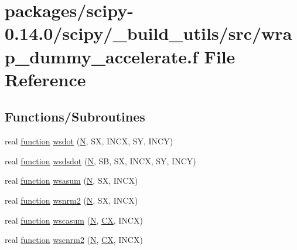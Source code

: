 \hypertarget{wrap__dummy__accelerate_8f}{}\section{packages/scipy-\/0.14.0/scipy/\+\_\+build\+\_\+utils/src/wrap\+\_\+dummy\+\_\+accelerate.f File Reference}
\label{wrap__dummy__accelerate_8f}
\subsection*{Functions/\+Subroutines}
\begin{DoxyCompactItemize}
\item 
real \hyperlink{afunc_8m_a7b5e596df91eadea6c537c0825e894a7}{function} \hyperlink{wrap__dummy__accelerate_8f_a1b9bea8bb64ba3df6b68f5a3bd335dd3}{wsdot} (\hyperlink{polmisc_8c_a0240ac851181b84ac374872dc5434ee4}{N}, S\+X, I\+N\+C\+X, S\+Y, I\+N\+C\+Y)
\item 
real \hyperlink{afunc_8m_a7b5e596df91eadea6c537c0825e894a7}{function} \hyperlink{wrap__dummy__accelerate_8f_aff7be3c1ed0bc89dd78a56568ad1c358}{wsdsdot} (\hyperlink{polmisc_8c_a0240ac851181b84ac374872dc5434ee4}{N}, S\+B, S\+X, I\+N\+C\+X, S\+Y, I\+N\+C\+Y)
\item 
real \hyperlink{afunc_8m_a7b5e596df91eadea6c537c0825e894a7}{function} \hyperlink{wrap__dummy__accelerate_8f_abc60eaafcfdb27c2f5ef726d8a9180e9}{wsasum} (\hyperlink{polmisc_8c_a0240ac851181b84ac374872dc5434ee4}{N}, S\+X, I\+N\+C\+X)
\item 
real \hyperlink{afunc_8m_a7b5e596df91eadea6c537c0825e894a7}{function} \hyperlink{wrap__dummy__accelerate_8f_a9dece8eb6e8208e78b365d485db1b2ef}{wsnrm2} (\hyperlink{polmisc_8c_a0240ac851181b84ac374872dc5434ee4}{N}, S\+X, I\+N\+C\+X)
\item 
real \hyperlink{afunc_8m_a7b5e596df91eadea6c537c0825e894a7}{function} \hyperlink{wrap__dummy__accelerate_8f_a8d09ac32537f600cd4d2c1426cb9c2c3}{wscasum} (\hyperlink{polmisc_8c_a0240ac851181b84ac374872dc5434ee4}{N}, \hyperlink{scsum1_8c_a5a76da95c549c41790389a76e12fdcb5}{C\+X}, I\+N\+C\+X)
\item 
real \hyperlink{afunc_8m_a7b5e596df91eadea6c537c0825e894a7}{function} \hyperlink{wrap__dummy__accelerate_8f_ad0461dd7ac977372fce478ead1ea96c2}{wscnrm2} (\hyperlink{polmisc_8c_a0240ac851181b84ac374872dc5434ee4}{N}, \hyperlink{scsum1_8c_a5a76da95c549c41790389a76e12fdcb5}{C\+X}, I\+N\+C\+X)

\end{DoxyCompactItemize}
